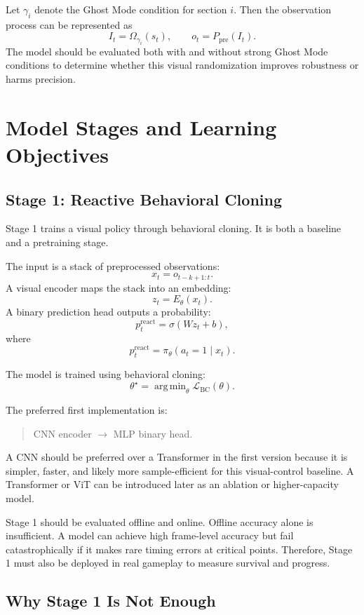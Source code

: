 \documentclass[11pt]{article}
\newcommand{\BC}{\mathrm{BC}}
\newcommand{\Ppre}{P_{\mathrm{pre}}}
\DeclareMathOperator*{\argmin}{arg\,min}
\begin{document}
Let \(\gamma_i\) denote the Ghost Mode condition for section \(i\). Then the observation process can be represented as
\[
  I_t = \Omega_{\gamma_i}(s_t),
  \qquad
  o_t = \Ppre(I_t).
\]
The model should be evaluated both with and without strong Ghost Mode conditions to determine whether this visual randomization improves robustness or harms precision.

\section{Model Stages and Learning Objectives}

\subsection{Stage 1: Reactive Behavioral Cloning}

Stage 1 trains a visual policy through behavioral cloning. It is both a baseline and a pretraining stage.

The input is a stack of preprocessed observations:
\[
  x_t = o_{t-k+1:t}.
\]
A visual encoder maps the stack into an embedding:
\[
  z_t = E_\theta(x_t).
\]
A binary prediction head outputs a probability:
\[
  p_t^{\mathrm{react}} = \sigma(Wz_t+b),
\]
where
\[
  p_t^{\mathrm{react}} = \pi_\theta(a_t=1 \mid x_t).
\]

The model is trained using behavioral cloning:
\[
  \theta^\star = \argmin_\theta \mathcal{L}_{\BC}(\theta).
\]

The preferred first implementation is:
\begin{quote}
CNN encoder \(\rightarrow\) MLP binary head.
\end{quote}
A CNN should be preferred over a Transformer in the first version because it is simpler, faster, and likely more sample-efficient for this visual-control baseline. A Transformer or ViT can be introduced later as an ablation or higher-capacity model.

Stage 1 should be evaluated offline and online. Offline accuracy alone is insufficient. A model can achieve high frame-level accuracy but fail catastrophically if it makes rare timing errors at critical points. Therefore, Stage 1 must also be deployed in real gameplay to measure survival and progress.

\subsection{Why Stage 1 Is Not Enough}
\end{document}
